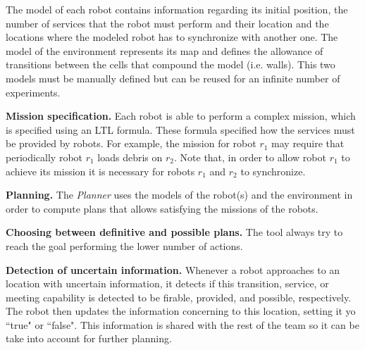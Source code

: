The model of each robot contains information regarding its initial position, the number of services that the robot must perform and their location and the locations where the modeled robot has to synchronize with another one.  
The model of the environment represents its map and defines the allowance of transitions between the cells that compound the model (i.e. walls). 
This two models must be manually defined but can be reused for an infinite number of experiments.





\textbf{Mission specification.}
Each robot is able to perform a complex mission, which is specified using an LTL formula.
These formula specified how the services must be provided by robots.
For example, the mission for robot $r_1$ may require that  periodically robot $r_1$ loads debris on $r_2$.
Note that, in order to allow robot $r_1$ to achieve its mission it is necessary for robots $r_1$ and $r_2$ to synchronize.





\textbf{Planning.} 
The \emph{Planner}  uses the models of the robot(s) and the environment in order to compute plans that allows satisfying the missions of the robots.




\textbf{Choosing between definitive and possible plans.}
The tool always try to reach the goal performing the lower number of actions.

\textbf{Detection of uncertain information.}
Whenever a robot approaches to an location with uncertain information, it detects if this transition, service, or meeting capability is detected to be firable, provided, and possible, respectively.
The robot then updates the information concerning to this location, setting it yo ``true" or ``false".
This information is shared with the rest of the team so it can be take into account for further planning.






